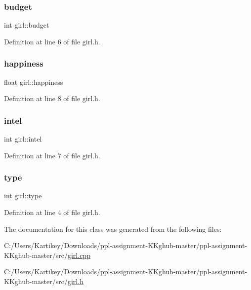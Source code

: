 \subsubsection{\texorpdfstring{budget}{budget}}
{\footnotesize\ttfamily int girl\+::budget}



Definition at line 6 of file girl.\+h.

\mbox{\label{classgirl_a29904a0d088ca25b70303936110b19cd}} 
\subsubsection{\texorpdfstring{happiness}{happiness}}
{\footnotesize\ttfamily float girl\+::happiness}



Definition at line 8 of file girl.\+h.

\mbox{\label{classgirl_a909600ba1a2bd73d658c59421e6634f8}} 
\subsubsection{\texorpdfstring{intel}{intel}}
{\footnotesize\ttfamily int girl\+::intel}



Definition at line 7 of file girl.\+h.

\mbox{\label{classgirl_a8e02617b5ea362f8c1311713de02f977}} 
\subsubsection{\texorpdfstring{type}{type}}
{\footnotesize\ttfamily int girl\+::type}



Definition at line 4 of file girl.\+h.



The documentation for this class was generated from the following files\+:\begin{DoxyCompactItemize}
\item 
C\+:/\+Users/\+Kartikey/\+Downloads/ppl-\/assignment-\/\+K\+Kghub-\/master/ppl-\/assignment-\/\+K\+Kghub-\/master/src/\hyperlink{girl_8cpp}{girl.\+cpp}\item 
C\+:/\+Users/\+Kartikey/\+Downloads/ppl-\/assignment-\/\+K\+Kghub-\/master/ppl-\/assignment-\/\+K\+Kghub-\/master/src/\hyperlink{girl_8h}{girl.\+h}\end{DoxyCompactItemize}
